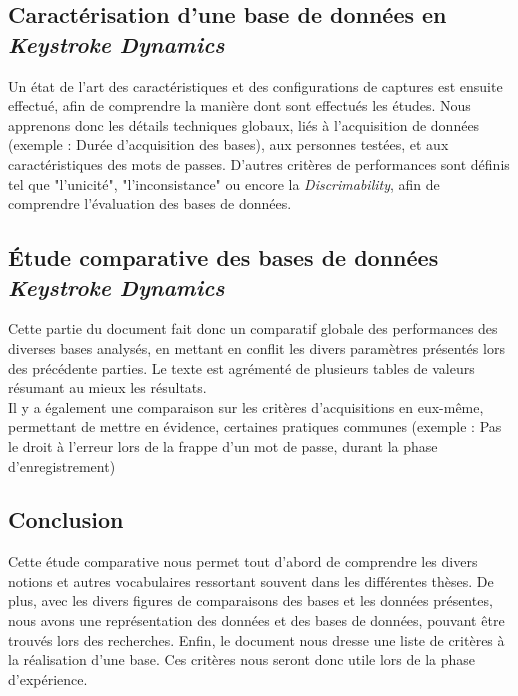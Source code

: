 \subsection{Caractérisation d'une base de données en \textit{Keystroke Dynamics}}

Un état de l'art des caractéristiques et des configurations de captures est ensuite effectué, afin de comprendre la manière dont sont effectués les études. Nous apprenons donc les détails techniques globaux, liés à l'acquisition de données (exemple : Durée d'acquisition des bases), aux personnes testées, et aux caractéristiques des mots de passes. D'autres critères de performances sont  définis tel que "l'unicité", "l'inconsistance" ou encore la \textit{Discrimability}, afin de comprendre l'évaluation des bases de données.

\subsection{Étude comparative des bases de données \textit{Keystroke Dynamics}}

Cette partie du document fait donc un comparatif globale des performances des diverses bases analysés, en mettant en conflit les divers paramètres présentés lors des précédente parties. Le texte est agrémenté de plusieurs tables de valeurs résumant au mieux les résultats.\\

Il y a également une comparaison sur les critères d'acquisitions en eux-même, permettant de mettre en évidence, certaines pratiques communes (exemple : Pas le droit à l'erreur lors de la frappe d'un mot de passe, durant la phase d'enregistrement)

\subsection{Conclusion}

Cette étude comparative nous permet tout d'abord de comprendre les divers notions et autres vocabulaires ressortant souvent dans les différentes thèses. De plus, avec les divers figures de comparaisons des bases et les données présentes, nous avons une représentation des données et des bases de données, pouvant être trouvés lors des recherches. Enfin, le document nous dresse une liste de critères à la réalisation d'une base. Ces critères nous seront donc utile lors de la phase d'expérience.
